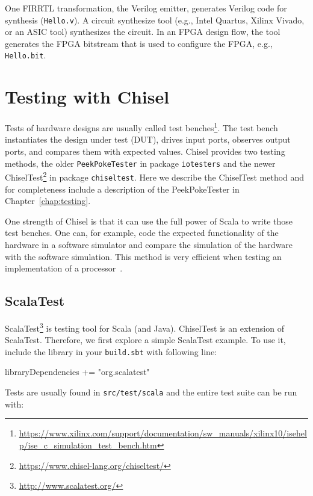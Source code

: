 \documentclass[%
    10pt,
    headinclude, footexclude,
    openright, %
    notitlepage,
    cleardoubleempty,
    headsepline,
    pointlessnumbers,
    bibtotoc, idxtotoc,
    ]{scrbook}
\newcommand{\code}[1]{{\small{\texttt{#1}}}}
\newcommand{\myref}[2]{\href{#1}{#2}}
\renewcommand{\myref}[2]{{#2}{\footnote{\url{#1}}}}
\begin{document}
One FIRRTL transformation, the Verilog emitter, generates Verilog code for synthesis (\code{Hello.v}).
A circuit synthesize tool (e.g., Intel Quartus, Xilinx Vivado, or an ASIC tool) synthesizes the circuit.
In an FPGA design flow, the tool generates the FPGA bitstream that is used to configure the FPGA,
e.g., \code{Hello.bit}.


\section{Testing with Chisel}

Tests of hardware designs are usually called \myref{https://www.xilinx.com/support/documentation/sw_manuals/xilinx10/isehelp/ise_c_simulation_test_bench.htm}{test benches}.
The test bench instantiates the design under test (DUT), drives input ports, observes output ports,
and compares them with expected values.
Chisel provides two testing methods, the older \code{PeekPokeTester} in package \code{iotesters}
and the newer \myref{https://www.chisel-lang.org/chiseltest/}{ChiselTest} in package \code{chiseltest}.
Here we describe the ChiselTest method and for completeness include a description of
the PeekPokeTester in Chapter~\ref{chap:testing}.

One strength of Chisel is that it can use the full power of Scala to write those
test benches. One can, for example, code the expected functionality of the hardware
in a software simulator and compare the simulation of the hardware with the
software simulation. This method is very efficient when testing an implementation
of a processor~\cite{lipsi:arcs2018}.

\subsection{ScalaTest}

\myref{http://www.scalatest.org/}{ScalaTest} is  testing tool for Scala (and Java). ChiselTest is an extension
of ScalaTest. Therefore, we first explore a simple ScalaTest example. To use it, include the library
in your \code{build.sbt} with following line:

\begin{chisel}
libraryDependencies += "org.scalatest" %
\end{chisel}

\noindent Tests are usually found in \code{src/test/scala} and the entire test suite can be run with:
\end{document}
